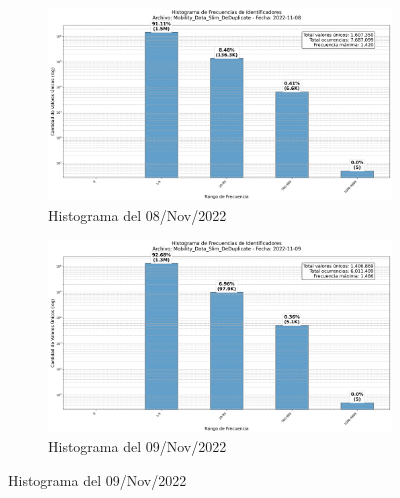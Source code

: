 \begin{figure}[htbp]
    \vspace{0.5cm}

    \begin{subfigure}[t]{0.48\textwidth-1em}
        \includegraphics[width=\linewidth]{img/daily_histograms/histograma_identifier_Mobility_Data_Slim_DeDuplicate_2022-11-08.png}
        \caption{Histograma del 08/Nov/2022}
        \label{fig:sub3}
    \end{subfigure}
    \hfill
    \begin{subfigure}[t]{0.48\textwidth-1em}
        \includegraphics[width=\linewidth]{img/daily_histograms/histograma_identifier_Mobility_Data_Slim_DeDuplicate_2022-11-09.png}
        \caption{Histograma del 09/Nov/2022}
        \label{fig:sub4}
    \end{subfigure}
\end{figure}


